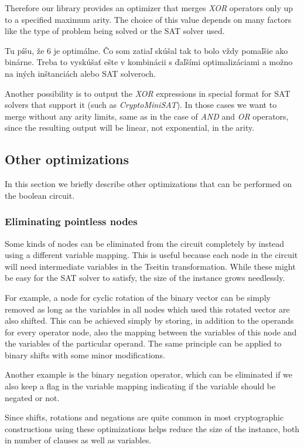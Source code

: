 Therefore our library provides an optimizer that merges \emph{XOR} operators only up to a specified maximum arity.
The choice of this value depends on many factors like the type of problem being solved or the SAT solver used.
\begin{framed}
\noindent Tu\citep{bard2007efficient} píšu, že 6 je optimálne. Čo som zatiaľ skúšal tak to bolo vždy pomaľšie ako binárne. Treba to vyskúšať ešte v kombinácii s ďaľšími optimalizáciami a možno na iných inštanciách alebo SAT solveroch.
\end{framed}

Another possibility is to output the \emph{XOR} expressions in special format for SAT solvers that support it (such as \emph{CryptoMiniSAT}).
In those cases we want to merge without any arity limits, same as in the case of \emph{AND} and \emph{OR} operators, since the resulting output will be linear, not exponential, in the arity.

\subsection{Other optimizations}
In this section we briefly describe other optimizations that can be performed on the boolean circuit.

\subsubsection{Eliminating pointless nodes}
Some kinds of nodes can be eliminated from the circuit completely by instead using a different variable mapping.
This is useful because each node in the circuit will need intermediate variables in the Tseitin transformation.
While these might be easy for the SAT solver to satisfy, the size of the instance grows needlessly.

For example, a node for cyclic rotation of the binary vector can be simply removed as long as the variables in all nodes which used this rotated vector are also shifted.
This can be achieved simply by storing, in addition to the operands for every operator node, also the mapping between the variables of this node and the variables of the particular operand.
The same principle can be applied to binary shifts with some minor modifications.

Another example is the binary negation operator, which can be eliminated if we also keep a flag in the variable mapping indicating if the variable should be negated or not.

Since shifts, rotations and negations are quite common in most cryptographic constructions using these optimizations helps reduce the size of the instance, both in number of clauses as well as variables.

